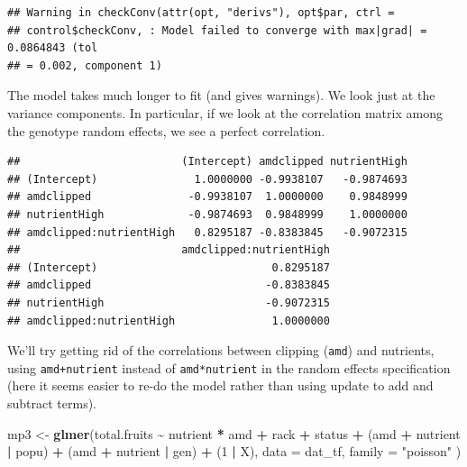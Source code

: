 \documentclass[
  12pt,
]{book}
\newenvironment{Shaded}{\begin{snugshade}}{\end{snugshade}}
\newcommand{\DataTypeTok}[1]{\textcolor[rgb]{0.13,0.29,0.53}{#1}}
\newcommand{\DecValTok}[1]{\textcolor[rgb]{0.00,0.00,0.81}{#1}}
\newcommand{\KeywordTok}[1]{\textcolor[rgb]{0.13,0.29,0.53}{\textbf{#1}}}
\newcommand{\NormalTok}[1]{#1}
\newcommand{\OperatorTok}[1]{\textcolor[rgb]{0.81,0.36,0.00}{\textbf{#1}}}
\newcommand{\StringTok}[1]{\textcolor[rgb]{0.31,0.60,0.02}{#1}}
\begin{document}
\begin{verbatim}
## Warning in checkConv(attr(opt, "derivs"), opt$par, ctrl =
## control$checkConv, : Model failed to converge with max|grad| = 0.0864843 (tol
## = 0.002, component 1)
\end{verbatim}

The model takes much longer to fit (and gives warnings).
We look just at the variance components. In particular, if we look at the correlation matrix among the genotype random effects, we see a perfect
correlation.

\begin{Shaded}
\end{Shaded}

\begin{verbatim}
##                         (Intercept) amdclipped nutrientHigh
## (Intercept)               1.0000000 -0.9938107   -0.9874693
## amdclipped               -0.9938107  1.0000000    0.9848999
## nutrientHigh             -0.9874693  0.9848999    1.0000000
## amdclipped:nutrientHigh   0.8295187 -0.8383845   -0.9072315
##                         amdclipped:nutrientHigh
## (Intercept)                           0.8295187
## amdclipped                           -0.8383845
## nutrientHigh                         -0.9072315
## amdclipped:nutrientHigh               1.0000000
\end{verbatim}

We'll try getting rid of the correlations between clipping (\texttt{amd}) and nutrients, using \texttt{amd+nutrient} instead of \texttt{amd*nutrient} in the random effects specification (here it seems easier to re-do the model rather than using update to add and subtract terms).

\begin{Shaded}
\begin{Highlighting}[]
\NormalTok{mp3 \textless{}{-}}\StringTok{ }\KeywordTok{glmer}\NormalTok{(total.fruits }\OperatorTok{\textasciitilde{}}\StringTok{ }\NormalTok{nutrient }\OperatorTok{*}\StringTok{ }\NormalTok{amd }\OperatorTok{+}
\StringTok{  }\NormalTok{rack }\OperatorTok{+}\StringTok{ }\NormalTok{status }\OperatorTok{+}
\StringTok{  }\NormalTok{(amd }\OperatorTok{+}\StringTok{ }\NormalTok{nutrient }\OperatorTok{|}\StringTok{ }\NormalTok{popu) }\OperatorTok{+}
\StringTok{  }\NormalTok{(amd }\OperatorTok{+}\StringTok{ }\NormalTok{nutrient }\OperatorTok{|}\StringTok{ }\NormalTok{gen) }\OperatorTok{+}\StringTok{ }\NormalTok{(}\DecValTok{1} \OperatorTok{|}\StringTok{ }\NormalTok{X),}
\DataTypeTok{data =}\NormalTok{ dat\_tf, }\DataTypeTok{family =} \StringTok{"poisson"}
\NormalTok{)}
\end{Highlighting}
\end{Shaded}
\end{document}

